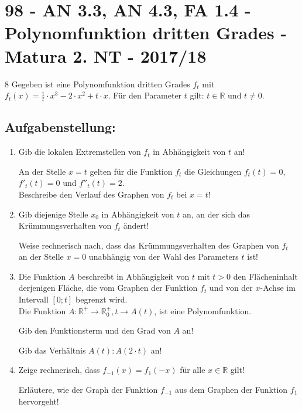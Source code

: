 \section{98 - AN 3.3, AN 4.3, FA 1.4 - Polynomfunktion dritten Grades - Matura 2. NT - 2017/18}

\begin{langesbeispiel} \item[8] %
Gegeben ist eine Polynomfunktion dritten Grades $f_t$ mit $f_t(x)=\frac{1}{t}\cdot x^3-2\cdot x^2+t\cdot x$. Für den Parameter $t$ gilt: $t\in\mathbb{R}$ und $t\neq 0$.

\subsection{Aufgabenstellung:}
\begin{enumerate}
	\item {} Gib die lokalen Extremstellen von $f_t$ in Abhängigkeit von $t$ an!
	
	An der Stelle $x=t$ gelten für die Funktion $f_t$ die Gleichungen $f_t(t)=0$, $f'_t(t)=0$ und $f''_t(t)=2$.\\
	Beschreibe den Verlauf des Graphen von $f_t$ bei $x=t$!
	
	\item Gib diejenige Stelle $x_0$ in Abhängigkeit von $t$ an, an der sich das Krümmungsverhalten von $f_t$ ändert!
	
	Weise rechnerisch nach, dass das Krümmungsverhalten des Graphen von $f_t$ an der Stelle $x=0$ unabhängig von der Wahl des Parameters $t$ ist!
	
	\item Die Funktion $A$ beschreibt in Abhängigkeit von $t$ mit $t>0$ den Flächeninhalt derjenigen Fläche, die vom Graphen der Funktion $f_t$ und von der $x$-Achse im Intervall $[0;t]$ begrenzt wird.\\
	Die Funktion $A\!:\mathbb{R}^+\rightarrow\mathbb{R}^+_0, t\rightarrow A(t)$, ist eine Polynomfunktion.
	
	Gib den Funktionsterm und den Grad von $A$ an!
	
	Gib das Verhältnis $A(t):A(2\cdot t)$ an!
	
	\item Zeige rechnerisch, dass $f_{-1}(x)=f_1(-x)$ für alle $x\in\mathbb{R}$ gilt!
	
	Erläutere, wie der Graph der Funktion $f_{-1}$ aus dem Graphen der Funktion $f_1$ hervorgeht!
\end{enumerate}


\end{langesbeispiel}
